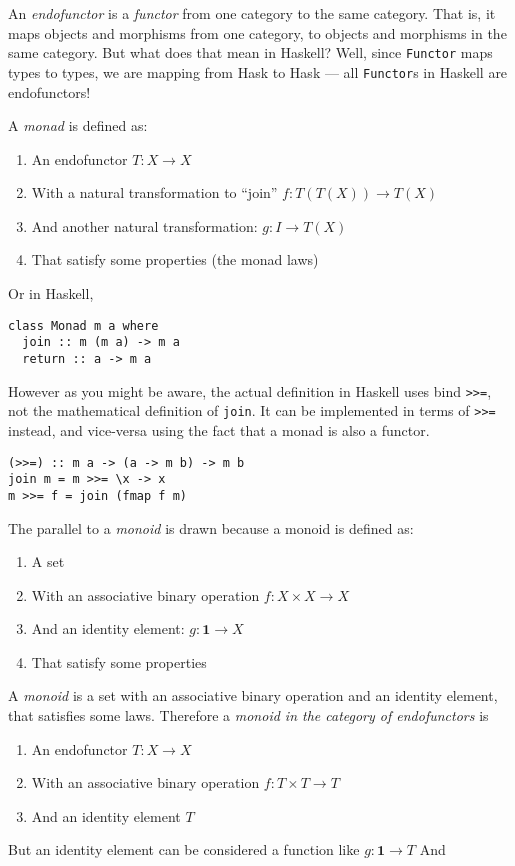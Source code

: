 An \textit{endofunctor} is a \textit{functor} from one category to the
same category. That is, it maps objects and morphisms from one
category, to objects and morphisms in the same category. But what does
that mean in Haskell? Well, since \texttt{Functor} maps
types to types, we are mapping from \textsf{Hask} to \textsf{Hask} ---
all \texttt{Functor}s in Haskell are endofunctors!

A \textit{monad} is defined as:
\begin{enumerate}
\item An endofunctor $T : X \rightarrow X$
\item With a natural transformation to ``join'' $f : T(T(X)) \rightarrow T(X)$
\item And another natural transformation: $g : I \rightarrow T(X)$
\item That satisfy some properties (the monad laws)
\end{enumerate}

Or in Haskell,
\begin{verbatim}
class Monad m a where
  join :: m (m a) -> m a
  return :: a -> m a
\end{verbatim}
However as you might be aware, the actual definition in Haskell uses
bind \texttt{>>=}, not the mathematical definition of
\texttt{join}. It can be implemented in terms of
\texttt{>>=} instead, and vice-versa using the fact that
a monad is also a functor.
\begin{verbatim}
(>>=) :: m a -> (a -> m b) -> m b
join m = m >>= \x -> x
m >>= f = join (fmap f m)
\end{verbatim}

The parallel to a \textit{monoid} is drawn because a monoid is defined as:
\begin{enumerate}
\item A set
\item With an associative binary operation $f : X \times X \rightarrow X$
\item And an identity element: $g : \mathbf{1} \rightarrow X$
\item That satisfy some properties
\end{enumerate}

A \textit{monoid} is a set with an associative binary operation and an
identity element, that satisfies some laws.
Therefore a \textit{monoid in the category of
  endofunctors} is
\begin{enumerate}
\item An endofunctor $T : X \rightarrow X$
\item With an associative binary operation $f : T \times T \rightarrow T$
\item And an identity element $T$
\end{enumerate}
But an identity element can be considered a function like $g :
\mathbf{1} \rightarrow T$
And 


